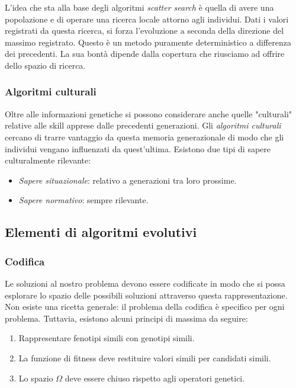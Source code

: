 \documentclass[10pt,a4paper]{article}
\begin{document}
L'idea che sta alla base degli algoritmi \emph{scatter search} è quella di avere una popolazione e di operare una ricerca locale attorno agli individui. Dati i valori registrati da questa ricerca, si forza l'evoluzione a seconda della direzione del massimo registrato. Questo è un metodo puramente deterministico a differenza dei precedenti. La sua bontà dipende dalla copertura che riusciamo ad offrire dello spazio di ricerca. 

\subsubsection{Algoritmi culturali}

Oltre alle informazioni genetiche si possono considerare anche quelle "culturali" relative alle skill apprese dalle precedenti generazioni. Gli \emph{algoritmi culturali} cercano di trarre vantaggio da questa memoria generazionale di modo che gli individui vengano influenzati da quest'ultima. Esistono due tipi di sapere culturalmente rilevante:

\begin{itemize}
\item{\emph{Sapere situazionale}: relativo a generazioni tra loro prossime.}
\item{\emph{Sapere normativo}: sempre rilevante.}
\end{itemize}

\subsection{Elementi di algoritmi evolutivi}

\subsubsection{Codifica}

Le soluzioni al nostro problema devono essere codificate in modo che si possa esplorare lo spazio delle possibili soluzioni attraverso questa rappresentazione. Non esiste una ricetta generale: il problema della codifica è specifico per ogni problema. Tuttavia, esistono alcuni principi di massima da seguire:

\begin{enumerate}
\item{Rappresentare fenotipi simili con genotipi simili.}
\item{La funzione di fitness deve restituire valori simili per candidati simili.}
\item{Lo spazio $\Omega$ deve essere chiuso rispetto agli operatori genetici.}
\end{enumerate}
\end{document}

